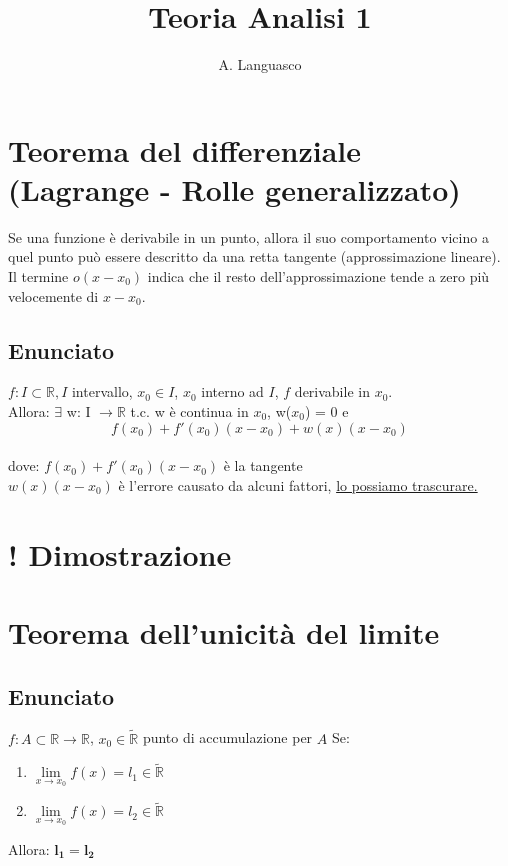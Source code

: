 \documentclass{article}
\author{A. Languasco}
\title{Teoria Analisi 1}
\newcommand{\R}{\mathbb{R}}
\newcommand{\Rext}{\widetilde{\mathbb{R}}}
\begin{document}
\maketitle
\tableofcontents\newpage

\begin{flushleft}

\section{Teorema del differenziale (Lagrange - Rolle generalizzato)}
Se una funzione è derivabile in un punto, allora il suo comportamento vicino a quel punto può essere descritto da una retta tangente (approssimazione lineare). Il termine 
$o(x - x_0)$ indica che il resto dell'approssimazione tende a zero più velocemente di $x - x_0$.\\
\subsection{Enunciato}
$f: I \subset \R, I$ intervallo, $x_0 \in I$, $x_0$ interno ad $I$, $f$ derivabile in $x_0$.
\\Allora: $\exists$ w: I $\rightarrow \R$ t.c. w è continua in $x_0$, w($x_0$) = 0 e
\[
    f(x_0) + f'(x_0)(x-x_0)+w(x)(x-x_0)
\]
\\dove: $f(x_0) + f'(x_0)(x-x_0)$ è la tangente
\\\hspace{2.3em} $w(x)(x-x_0)$ è l'errore causato da alcuni fattori, \underline{lo possiamo trascurare.}

\section{! Dimostrazione}

\section{Teorema dell'unicità del limite}
\subsection{Enunciato}
$f: A \subset \R \rightarrow \R$, $x_0 \in \Rext$ punto di accumulazione per $A$
Se:
\begin{enumerate}
    \item $\lim\limits_{x \to x_0} f(x) = l_1 \in \Rext$
    \item $\lim\limits_{x \to x_0} f(x) = l_2 \in \Rext$
\end{enumerate}
Allora: $\mathbf{l_1 = l_2}$


\end{flushleft}
\end{document}
